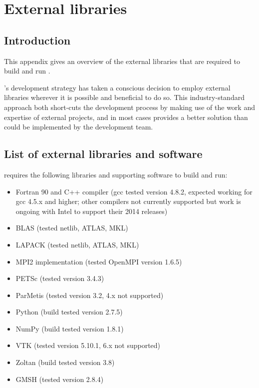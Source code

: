 \chapter{External libraries}\label{chap:external}

\section{Introduction}

This appendix gives an overview of the external libraries that are required to
build and run \fluidity.

\fluidity's development strategy has taken a conscious decision to employ
external libraries wherever it is possible and beneficial to do so. This
industry-standard approach both short-cuts the development process by making
use of the work and expertise of external projects, and in most cases provides
a better solution than could be implemented by the \fluidity development team.

\section{List of external libraries and software}
\label{sec:required_ḻibraries_list}

\fluidity requires the following libraries and supporting software to build and
run:

\begin{itemize}
\item Fortran 90 and C++ compiler (gcc tested version 4.8.2, expected working for gcc 4.5.x and higher; other compilers not currently supported but work is ongoing with Intel to support their 2014 releases)
\item BLAS (tested netlib, ATLAS, MKL)
\item LAPACK (tested netlib, ATLAS, MKL)
\item MPI2 implementation (tested OpenMPI version 1.6.5)
\item PETSc (tested version 3.4.3)
\item ParMetis (tested version 3.2, 4.x not supported)
\item Python (build tested version 2.7.5) 
\item NumPy (build tested version 1.8.1)
\item VTK (tested version 5.10.1, 6.x not supported)
\item Zoltan (build tested version 3.8)
\item GMSH (tested version 2.8.4)
\end{itemize}

